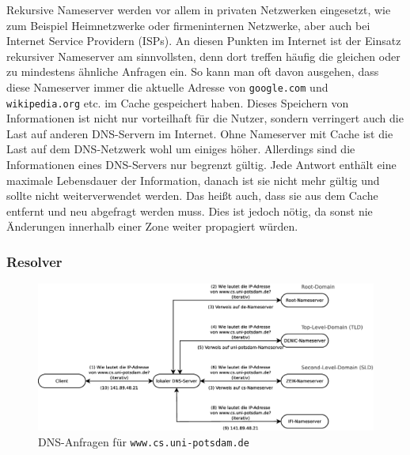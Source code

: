 \documentclass[a4paper, 12pt, BCOR10mm, DIV12, toc=bibliography, toc=listof, german]{scrbook}
\begin{document}
			Rekursive Nameserver werden vor allem in privaten Netzwerken eingesetzt, wie zum Beispiel
			Heimnetzwerke oder firmeninternen Netzwerke, aber auch bei Internet Service Providern
			(ISPs). An diesen Punkten im Internet ist der Einsatz rekursiver Nameserver am sinnvollsten,
			denn dort treffen häufig die gleichen oder zu mindestens ähnliche Anfragen ein. So kann man
			oft davon ausgehen, dass diese Nameserver immer die aktuelle Adresse von \texttt{google.com} und
			\texttt{wikipedia.org} etc. im Cache gespeichert haben. Dieses Speichern von Informationen
			ist nicht nur vorteilhaft für die Nutzer, sondern verringert auch die Last auf anderen
			DNS-Servern im Internet. Ohne Nameserver mit Cache ist die Last auf dem DNS-Netzwerk wohl um
			einiges höher. Allerdings sind die Informationen eines DNS-Servers nur begrenzt gültig.
			Jede Antwort enthält eine maximale Lebensdauer der Information, danach ist sie nicht mehr
			gültig und sollte nicht weiterverwendet werden. Das heißt auch, dass sie aus dem Cache entfernt
			und neu abgefragt werden muss. Dies ist jedoch nötig, da sonst nie Änderungen innerhalb einer Zone
			weiter propagiert würden.


			\subsubsection*{Resolver} %

				\begin{figure}
					\centering
					\includegraphics[width=\textwidth]{images/request}
					\caption{DNS-Anfragen für \texttt{www.cs.uni-potsdam.de}}
					\label{fig:bsp-request}
				\end{figure}
\end{document}
